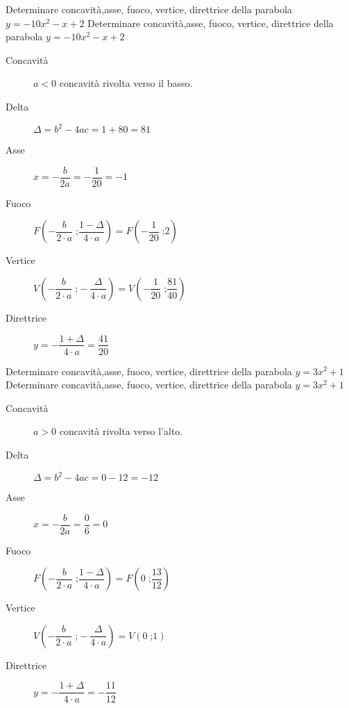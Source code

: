  \begin{exercise}
	Determinare concavità,asse, fuoco, vertice, direttrice della parabola $y=-10x^2-x+2$
	\tcblower
	Determinare concavità,asse, fuoco, vertice, direttrice della parabola $y=-10x^2-x+2$
	\begin{description}
		\item[Concavità] $a<0$ concavità rivolta verso il basso.
		\item[Delta] $\Delta=b^2-4ac=1+80=81$
		\item[Asse] $x=-\dfrac{b}{2a}=-\dfrac{1}{20}=-1$
		\item[Fuoco] $F\left(-\dfrac{b}{2\cdot a}\;\text{;}\dfrac{1-\Delta}{4\cdot a}\right)=F\left(-\dfrac{1}{20}\;\text{;}2\right)$
		\item[Vertice] $V\left(-\dfrac{b}{2\cdot a}\;\text{;}-\dfrac{\Delta}{4\cdot a}\right)=V\left(-\dfrac{1}{20}\;\text{;}\dfrac{81}{40}\right)$
		\item[Direttrice] $y=-\dfrac{1+\Delta}{4\cdot a}=\dfrac{41}{20}$
	\end{description}
\end{exercise}
\begin{exercise}
	Determinare concavità,asse, fuoco, vertice, direttrice della parabola $y=3x^2+1$
	\tcblower
	Determinare concavità,asse, fuoco, vertice, direttrice della parabola $y=3x^2+1$
	\begin{description}
		\item[Concavità] $a>0$ concavità rivolta verso l'alto.
		\item[Delta] $\Delta=b^2-4ac=0-12=-12$
		\item[Asse] $x=-\dfrac{b}{2a}=\dfrac{0}{6}=0$
		\item[Fuoco] $F\left(-\dfrac{b}{2\cdot a}\;\text{;}\dfrac{1-\Delta}{4\cdot a}\right)=F\left(0\;\text{;}\dfrac{13}{12}\right)$
		\item[Vertice] $V\left(-\dfrac{b}{2\cdot a}\;\text{;}-\dfrac{\Delta}{4\cdot a}\right)=V\left(0\;\text{;}1\right)$
		\item[Direttrice] $y=-\dfrac{1+\Delta}{4\cdot a}=-\dfrac{11}{12}$
	\end{description}
\end{exercise}
